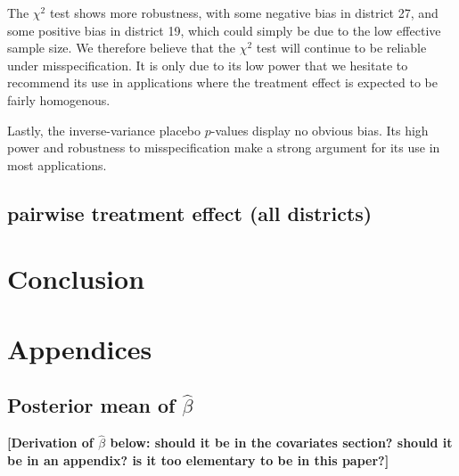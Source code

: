 \documentclass[letter]{article}
\begin{document}
The \(\chi^2\) test shows more robustness, with some negative bias in
district 27, and some positive bias in district 19, which could simply
be due to the low effective sample size. We therefore believe that the
\(\chi^2\) test will continue to be reliable under misspecification. It
is only due to its low power that we hesitate to recommend its use in
applications where the treatment effect is expected to be fairly
homogenous.

Lastly, the inverse-variance placebo \(p\)-values display no obvious
bias. Its high power and robustness to misspecification make a strong
argument for its use in most applications.
    


    	\subsection{pairwise treatment effect (all
districts)}\label{pairwise-treatment-effect-all-districts}
    


    	\section{Conclusion}\label{conclusion}
    


    	\section{Appendices}\label{appendices}
    


    	\subsection{\texorpdfstring{Posterior mean of
\(\hat\beta\)}{Posterior mean of \textbackslash{}hat\textbackslash{}beta}}\label{posterior-mean-of-hatbeta}

\textbf{{[}Derivation of \(\hat{\beta}\) below: should it be in the
covariates section? should it be in an appendix? is it too elementary to
be in this paper?{]}}
\end{document}
